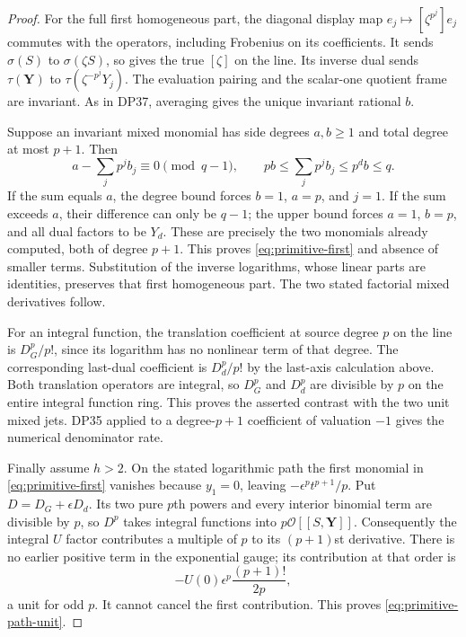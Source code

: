\begin{proof}
For the full first homogeneous part, the diagonal display map $e_j\mapsto[\zeta^{p^j}]e_j$ commutes with the operators, including Frobenius on its coefficients. It sends $\sigma(S)$ to $\sigma(\zeta S)$, so gives the true $[\zeta]$ on the line. Its inverse dual sends $\tau(\mathbf Y)$ to $\tau(\zeta^{-p^j}Y_j)$. The evaluation pairing and the scalar-one quotient frame are invariant. As in DP37, averaging gives the unique invariant rational $b$.

Suppose an invariant mixed monomial has side degrees $a,b\ge1$ and total degree at most $p+1$. Then
\[
 a-\sum_jp^jb_j\equiv0\pmod{q-1},\qquad
 pb\le\sum_jp^jb_j\le p^db\le q.
\]
If the sum equals $a$, the degree bound forces $b=1$, $a=p$, and $j=1$. If the sum exceeds $a$, their difference can only be $q-1$; the upper bound forces $a=1$, $b=p$, and all dual factors to be $Y_d$. These are precisely the two monomials already computed, both of degree $p+1$. This proves \eqref{eq:primitive-first} and absence of smaller terms. Substitution of the inverse logarithms, whose linear parts are identities, preserves that first homogeneous part. The two stated factorial mixed derivatives follow.

For an integral function, the translation coefficient at source degree $p$ on the line is $D_G^p/p!$, since its logarithm has no nonlinear term of that degree. The corresponding last-dual coefficient is $D_d^p/p!$ by the last-axis calculation above. Both translation operators are integral, so $D_G^p$ and $D_d^p$ are divisible by $p$ on the entire integral function ring. This proves the asserted contrast with the two unit mixed jets. DP35 applied to a degree-$p+1$ coefficient of valuation $-1$ gives the numerical denominator rate.

Finally assume $h>2$. On the stated logarithmic path the first monomial in \eqref{eq:primitive-first} vanishes because $y_1=0$, leaving $-\epsilon^pt^{p+1}/p$. Put $D=D_G+\epsilon D_d$. Its two pure $p$th powers and every interior binomial term are divisible by $p$, so $D^p$ takes integral functions into $p\mathcal O[[S,\mathbf Y]]$. Consequently the integral $U$ factor contributes a multiple of $p$ to its $(p+1)$st derivative. There is no earlier positive term in the exponential gauge; its contribution at that order is
\[
 -U(0)\epsilon^p\frac{(p+1)!}{2p},
\]
a unit for odd $p$. It cannot cancel the first contribution. This proves \eqref{eq:primitive-path-unit}.
\end{proof}

